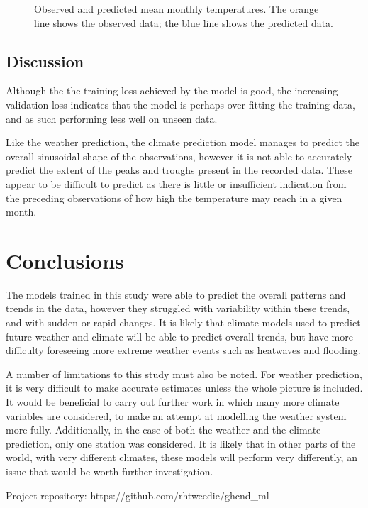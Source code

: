 \documentclass[12pt]{article}
\begin{document}
    \begin{figure}
        \centering
        
        \caption{Observed and predicted mean monthly temperatures. The orange line shows the observed data; the blue line shows the predicted data.}
        \label{fig:climate_prediction}
    \end{figure}

\subsection{Discussion}

     Although the the training loss achieved by the model is good, the increasing validation loss indicates that the model is perhaps 
     over-fitting the training data, and as such performing less well on unseen data.

     Like the weather prediction, the climate prediction model manages to predict the overall sinusoidal shape of the observations, 
     however it is not able to accurately predict the extent of the peaks and troughs present in the recorded data. These appear to be 
     difficult to predict as there is little or insufficient indication from the preceding observations of how high the temperature may 
     reach in a given month.
     
\section{Conclusions}

    The models trained in this study were able to predict the overall patterns and trends in the data, however they struggled with 
    variability within these trends, and with sudden or rapid changes. It is likely that climate models used to predict future weather 
    and climate will be able to predict overall trends, but have more difficulty foreseeing more extreme weather events such as 
    heatwaves and flooding.

    A number of limitations to this study must also be noted. For weather prediction, it is very difficult to make accurate estimates 
    unless the whole picture is included. It would be beneficial to carry out further work in which many more climate variables are 
    considered, to make an attempt at modelling the weather system more fully. Additionally, in the case of both the weather and the 
    climate prediction, only one station was considered. It is likely that in other parts of the world, with very different climates, 
    these models will perform very differently, an issue that would be worth further investigation.


\vspace{15pt}    
\noindent Project repository: https://github.com/rhtweedie/ghcnd\_ml

\printbibliography
\end{document}

